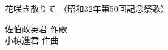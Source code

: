 \documentclass[10pt,b5j]{tarticle} %
\begin{document}
\begin{minipage}[c]{0.7\hsize} %
    \begin{center}
        {\LARGE
            花咲き散りて %
        }
        {\small 
            （昭和32年第50回記念祭歌） %
        }
    \end{center}
\end{minipage}
\begin{minipage}[c]{0.3\hsize} %
    \begin{flushright} %
        佐伯政英君 作歌\\小椋進君 作曲 %
    \end{flushright}
\end{minipage}
\end{document}

